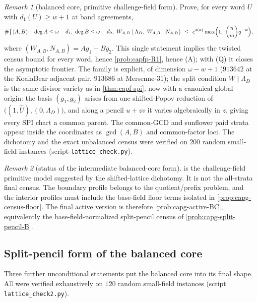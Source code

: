 \documentclass[11pt]{article}
\theoremstyle{definition}
\theoremstyle{remark}
\newtheorem{remark}[remark]{Remark}
\begin{document}
\begin{remark}[balanced core, primitive challenge-field form]\label{prob:capfp-balanced}
Prove, for every word $U$ with $d_1(U)\ge w+1$ at band agreements,
\[
        \#\bigl\{(A,B):\ \deg A\le\omega-d_1,\ \deg B\le\omega-d_2,\ W_{A,B}\mid\Lambda_D,\ W_{A,B}\mid N_{A,B}\bigr\}
        \ \le\ e^{o(n)}\max\Bigl(1,\ \binom nm q^{-w}\Bigr),
\]
where $(W_{A,B},N_{A,B})=Ag_1+Bg_2$.  This single statement implies the twisted census bound for every word, hence \cref{prob:capfp-R1}, hence \textup{(A)}; with \textup{(Q)} it closes the asymptotic frontier.  The family is explicit, of dimension $\omega-w+1$ \textup($913642$ at the KoalaBear adjacent pair, $913686$ at Mersenne-31\textup); the split condition $W\mid\Lambda_D$ is the same divisor variety as in \cref{thm:capf-spi}, now with a canonical global origin: the basis $(g_1,g_2)$ arises from one shifted-Popov reduction of $\bigl((1,\widehat U),(0,\Lambda_D)\bigr)$, and along a pencil $u+zv$ it varies algebraically in $z$, giving every SPI chart a common parent.  The common-GCD and sunflower paid strata appear inside the coordinates as $\gcd(A,B)$ and common-factor loci.  The dichotomy and the exact unbalanced census were verified on $200$ random small-field instances \textup(script \texttt{lattice\_check.py}\textup).
\end{remark}


\begin{remark}[status of the intermediate balanced-core form]
\label{rem:capfp-balanced-active-reading}
 is the challenge-field primitive model suggested by
the shifted-lattice dichotomy.  It is not the all-strata final census.  The
boundary profile belongs to the quotient/prefix problem, and the interior
profiles must include the base-field floor terms isolated in
\cref{prop:capg-census-floor}.  The final active version is therefore
\cref{prob:capg-active-BC}, equivalently the base-field-normalized
split-pencil census of \cref{prob:capg-split-pencil-B}.
\end{remark}

\subsection{Split-pencil form of the balanced core}

Three further unconditional statements put the balanced core into its final shape.  All were verified exhaustively on $120$ random small-field instances \textup(script \texttt{lattice\_check2.py}\textup).
\end{document}
